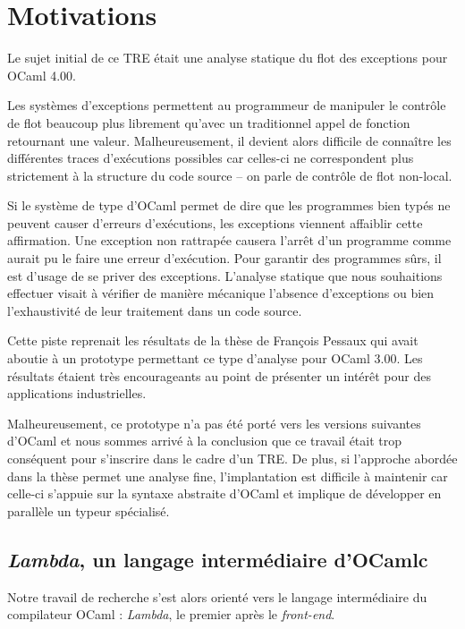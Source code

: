 \section{Motivations}

Le sujet initial de ce TRE était une analyse statique du flot des exceptions
pour OCaml 4.00. 

Les systèmes d'exceptions permettent au programmeur de manipuler le contrôle de
flot beaucoup plus librement qu'avec un traditionnel appel de fonction
retournant une valeur. Malheureusement, il devient alors difficile de connaître
les différentes traces d'exécutions possibles car celles-ci ne correspondent
plus strictement à la structure du code source -- on parle de contrôle de flot
non-local.

Si le système de type d'OCaml permet de dire que les programmes bien typés ne
peuvent causer d'erreurs d'exécutions, les exceptions viennent affaiblir cette
affirmation.  Une exception non rattrapée causera l'arrêt d'un programme comme
aurait pu le faire une erreur d'exécution.  Pour garantir des programmes sûrs,
il est d'usage de se priver des exceptions.  L'analyse statique que nous
souhaitions effectuer visait à vérifier de manière mécanique l'absence
d'exceptions ou bien l'exhaustivité de leur traitement dans un code source.

Cette piste reprenait les résultats de la thèse de François Pessaux
\cite{ExcAnalysis} qui avait aboutie à un prototype permettant ce type
d'analyse pour OCaml 3.00.  Les résultats étaient très encourageants au point
de présenter un intérêt pour des applications industrielles.

Malheureusement, ce prototype n'a pas été porté vers les versions suivantes
d'OCaml et nous sommes arrivé à la conclusion que ce travail était trop
conséquent pour s'inscrire dans le cadre d'un TRE.  De plus, si l'approche
abordée dans la thèse permet une analyse fine, l'implantation est difficile à
maintenir car celle-ci s'appuie sur la syntaxe abstraite d'OCaml et implique de
développer en parallèle un typeur spécialisé.

\subsection{\emph{Lambda}, un langage intermédiaire d'OCamlc}

Notre travail de recherche s'est alors orienté vers le langage intermédiaire du
compilateur OCaml : \emph{Lambda}, le premier après le \emph{front-end}.

